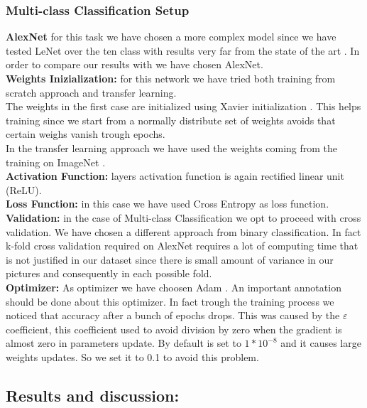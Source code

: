 \subsubsection{Multi-class Classification Setup}
\textbf{AlexNet}
for this task we have chosen a more complex model since we have tested LeNet over the ten class with results very far from the state of the art \cite{ref11}. In order to compare our results with \cite{ref11} we have chosen AlexNet.  \\
\textbf{Weights Inizialization:}
for this network we have tried both training from scratch approach and transfer learning. \\\indent The weights in the first case are initialized using Xavier initialization \cite{ref31}. This helps training  since we start from a normally distribute set of weights avoids that certain weighs vanish trough epochs.\\\indent In the transfer learning approach we have used the weights coming from the training on ImageNet \cite{imagenet}.
\\
\textbf{Activation Function:}
layers activation function is again rectified linear unit (ReLU).
\\
\textbf{Loss Function:}
in this case we have used Cross Entropy as loss function.
\\
\textbf{Validation:}
in the case of Multi-class Classification we opt to proceed with cross validation. We have chosen a different approach from binary classification. In fact k-fold cross validation required on AlexNet requires a lot of computing time that is not justified in our dataset since there is small amount of variance in our pictures and consequently in each possible fold.
\\
\textbf{Optimizer:}
As optimizer we have choosen Adam \cite{ref32}. An important annotation should be done about this optimizer. In fact trough the training process we noticed that accuracy after a bunch of epochs drops. This was caused by the $\varepsilon$ coefficient, this coefficient used to avoid division by zero when the gradient is almost zero in parameters update.  By default is set to $1*10^{-8}$ and it causes large weights updates. So we set it to 0.1 to avoid this problem.
\subsection{Results and discussion:}

